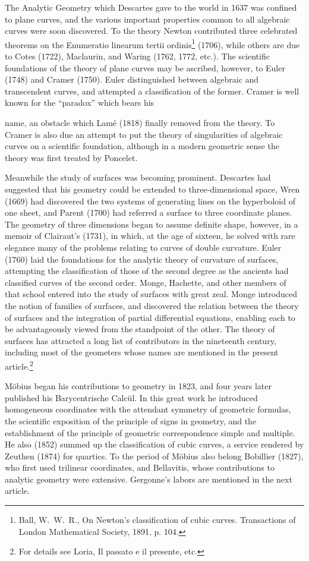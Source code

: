 \documentclass[oneside]{book}
\begin{document}
{The Analytic Geometry which Descartes gave to the world in 1637 was
confined to plane curves, and the various important properties
common to all algebraic curves were soon discovered. To the theory
Newton contributed three celebrated theorems on the Enumeratio
linearum tertii ordinis\footnote{Ball, W.~W.~R., On Newton's
classification of cubic curves. Transactions of London Mathematical
Society, 1891, p. 104.} (1706), while others are due to Cotes
(1722), Maclaurin, and Waring (1762, 1772, etc.). The scientific
foundations of the theory of plane curves may be ascribed, however,
to Euler (1748) and Cramer (1750). Euler distinguished between
algebraic and transcendent curves, and attempted a classification of
the former. Cramer is well known for the ``paradox'' which bears his

name, an obstacle which Lam\'e (1818) finally removed from the
theory. To Cramer is also due an attempt to put the theory of
singularities of algebraic curves on a scientific foundation,
although in a modern geometric sense the theory was first treated by
Poncelet.

Meanwhile the study of surfaces was becoming prominent. Descartes
had suggested that his geometry could be extended to
three-dimensional space, Wren (1669) had discovered the two systems
of generating lines on the hyperboloid of one sheet, and Parent
(1700) had referred a surface to three coordinate planes. The
geometry of three dimensions began to assume definite shape,
however, in a memoir of Clairaut's (1731), in which, at the age of
sixteen, he solved with rare elegance many of the problems relating
to curves of double curvature. Euler (1760) laid the foundations
for the analytic theory of curvature of surfaces, attempting the
classification of those of the second degree as the ancients had
classified curves of the second order. Monge, Hachette, and other
members of that school entered into the study of surfaces with great
zeal. Monge introduced the notion of families of surfaces, and
discovered the relation between the theory of surfaces and the
integration of partial differential equations, enabling each to be
advantageously viewed from the standpoint of the other. The theory
of surfaces has attracted a long list of contributors in the
nineteenth century, including most of the geometers whose names are
mentioned in the present article.\footnote{For details see Loria,
Il passato e il presente, etc.}

M\"obius began his contributions to geometry in 1823, and four years
later published his Barycentrische Calc\"ul. In this great work he
introduced homogeneous coordinates with the attendant symmetry of
geometric formulas, the scientific exposition of the principle of
signs in geometry, and the establishment of the principle of
geometric correspondence simple and multiple. He also (1852) summed
up the classification of cubic curves, a service rendered by
Zeuthen (1874) for quartics. To the period of M\"obius also belong
Bobillier (1827), who first used trilinear coordinates, and
Bellavitis, whose contributions to analytic geometry were
extensive. Gergonne's labors are mentioned in the next article.

}
\end{document}
